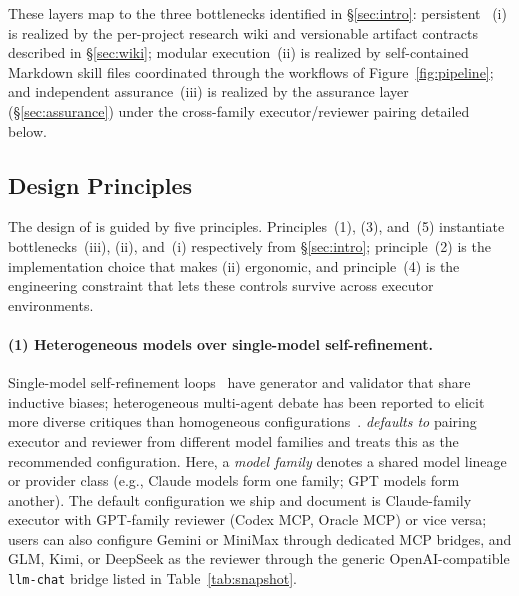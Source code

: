 These layers map to the three bottlenecks identified in \S\ref{sec:intro}: persistent \StateSymbol{}~(i) is realized by the per-project research wiki and versionable artifact contracts described in \S\ref{sec:wiki}; modular execution~(ii) is realized by self-contained Markdown skill files coordinated through the workflows of Figure~\ref{fig:pipeline}; and independent assurance~(iii) is realized by the assurance layer (\S\ref{sec:assurance}) under the cross-family executor/reviewer pairing detailed below.

\subsection{Design Principles}

The design of \aris{} is guided by five principles.
Principles~(1), (3), and~(5) instantiate bottlenecks~(iii), (ii), and~(i) respectively from \S\ref{sec:intro}; principle~(2) is the implementation choice that makes (ii) ergonomic, and principle~(4) is the engineering constraint that lets these controls survive across executor environments.

\paragraph{(1) Heterogeneous models over single-model self-refinement.}
Single-model self-refinement loops~\citep{madaan2023selfrefine,shinn2023reflexion} have generator and validator that share inductive biases; heterogeneous multi-agent debate has been reported to elicit more diverse critiques than homogeneous configurations~\citep{liang2024divergent,du2024multiagentdebate}.
\aris{} \emph{defaults to} pairing executor and reviewer from different model families and treats this as the recommended configuration.
Here, a \emph{model family} denotes a shared model lineage or provider class (e.g., Claude models form one family; GPT models form another).
The default configuration we ship and document is Claude-family executor with GPT-family reviewer (Codex MCP, Oracle MCP) or vice versa; users can also configure Gemini or MiniMax through dedicated MCP bridges, and GLM, Kimi, or DeepSeek as the reviewer through the generic OpenAI-compatible \texttt{llm-chat} bridge listed in Table~\ref{tab:snapshot}.

